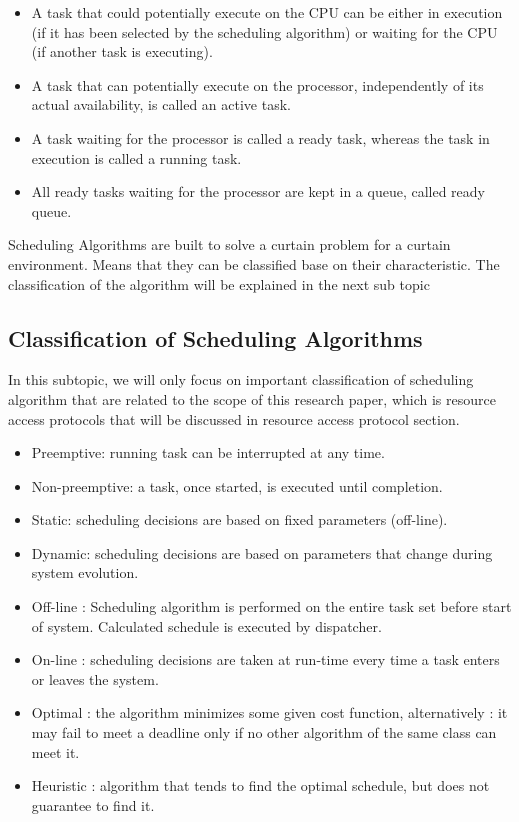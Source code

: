 \begin{itemize}
\item A task that could potentially execute on the CPU can be either in execution (if it has been selected by the scheduling algorithm) or waiting for the CPU (if another task is executing)\cite{b5}.

\item A task that can potentially execute on the processor, independently of its actual availability, is called an active task\cite{b5}.

\item A task waiting for the processor is called a ready task, whereas the task in execution is called a running task\cite{b5}.

\item All ready tasks waiting for the processor are kept in a queue, called ready queue\cite{b5}.

\end{itemize}

Scheduling Algorithms are built to solve a curtain problem for a curtain environment. Means that they can be classified base on their characteristic. The classification of the algorithm will be explained in the next sub topic

\subsection{Classification of Scheduling Algorithms}

In this subtopic, we will only focus on important classification of scheduling algorithm that are related to the scope of this research paper, which is resource access protocols that will be discussed in resource access protocol section. 

\begin{itemize}
\item Preemptive: running task can be interrupted at any time\cite{b5}.
\item Non-preemptive: a task, once started, is executed until completion\cite{b5}.
\item Static: scheduling decisions are based on fixed parameters (off-line)\cite{b5}.
\item Dynamic: scheduling decisions are based on parameters that change during system evolution\cite{b5}.
\item Off-line : Scheduling algorithm is performed on the entire task set before start of system. Calculated schedule is executed by dispatcher\cite{b5}. 
\item On-line : scheduling decisions are taken at run-time every time a task enters or leaves the system\cite{b5}.
\item Optimal : the algorithm minimizes some given cost function, alternatively : it may fail to meet a deadline only if no other algorithm of the same class can meet it\cite{b5}.
\item Heuristic : algorithm that tends to find the optimal schedule, but does not guarantee to find it\cite{b5}.
\end{itemize}

